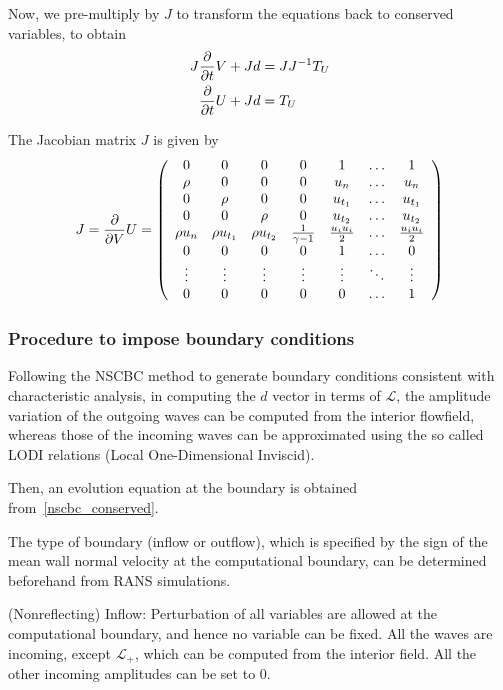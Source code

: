 Now, we pre-multiply by $J$ to transform the equations back to conserved 
variables, to obtain
%
\begin{align}
  J \frac{\partial }{\partial t}V
  + J d
  &= J J^{-1} T_U \\
  \frac{\partial }{\partial t}U
  + J d
  &= T_U
\label{nscbc_conserved}
\end{align}
%

The Jacobian matrix $J$ is given by
\begin{equation}
J = \frac{\partial }{\partial V}U =
\left(
\begin{array}{cccccccc}
 0 & 0 & 0 & 0 & 1 & \ldots & 1 \\
 \rho & 0 & 0 & 0 & u_n & \ldots & u_n \\
 0 & \rho & 0 & 0 & u_{t_1} & \ldots & u_{t_1} \\
 0 & 0 & \rho & 0 & u_{t_2} & \ldots & u_{t_2} \\
 \rho u_n & \rho u_{t_1} & \rho u_{t_2} & \frac{1}{\gamma-1} & \frac{u_i u_i}{2} & \ldots & \frac{u_i u_i}{2}  \\
 0 & 0 & 0 & 0 & 1 & \ldots & 0 \\
 \vdots & \vdots & \vdots & \vdots & \vdots & \ddots & \vdots \\
 0 & 0 & 0 & 0 & 0 & \ldots & 1
\end{array}
\right)
\end{equation}


\subsubsection{Procedure to impose boundary conditions}
Following the NSCBC method to generate boundary conditions consistent
with characteristic analysis, in computing the $d$ vector in terms of
$\mathcal{L}$, the amplitude variation of the outgoing waves can be computed
from the interior flowfield, whereas those of the incoming waves can be
approximated using the so called LODI relations (Local One-Dimensional
Inviscid).

Then, an evolution equation at the boundary is obtained
from~\eqref{nscbc_conserved}.  

The type of boundary (inflow or outflow), which is specified by the sign of the
mean wall normal velocity at the computational boundary, can be determined
beforehand from RANS simulations. 

(Nonreflecting) Inflow:
Perturbation of all variables are allowed at the computational boundary, and
hence no variable can be fixed. All the waves are incoming, except
$\mathcal{L}_+$, which can be computed from the interior field.  All the other
incoming amplitudes can be set to 0.

